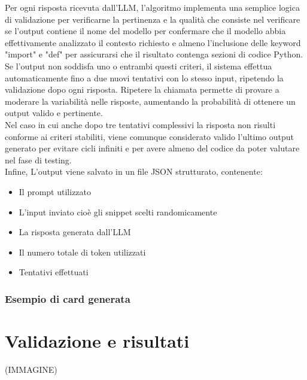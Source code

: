 \documentclass{article}
\begin{document}
\begin{itemize}
Per ogni risposta ricevuta dall'LLM, l'algoritmo implementa una semplice logica di validazione per verificarne la pertinenza e la qualità che consiste nel verificare se l'output contiene il nome del modello per confermare che il modello abbia effettivamente analizzato il contesto richiesto e almeno l'inclusione delle keyword "import" e "def" per assicurarsi che il risultato contenga sezioni di codice Python.\\
Se l'output non soddisfa uno o entrambi questi criteri, il sistema effettua automaticamente fino a due nuovi tentativi con lo stesso input, ripetendo la validazione dopo ogni risposta. Ripetere la chiamata permette di provare a moderare la variabilità nelle risposte, aumentando la probabilità di ottenere un output valido e pertinente.\\ 
Nel caso in cui anche dopo tre tentativi complessivi la risposta non risulti conforme ai criteri stabiliti, viene comunque considerato valido l'ultimo output generato per evitare cicli infiniti e per avere almeno del codice da poter valutare nel fase di testing.\\
Infine, L’output viene salvato in un file JSON strutturato, contenente:  
\begin{itemize}
    \item Il prompt utilizzato
    \item L'input inviato cioè gli snippet scelti randomicamente
    \item La risposta generata dall’LLM
    \item Il numero totale di token utilizzati
    \item Tentativi effettuati
\end{itemize}

\subsubsection{Esempio di card generata}



\end{itemize}

\section{Validazione e risultati}
(IMMAGINE)\\
\end{document}
